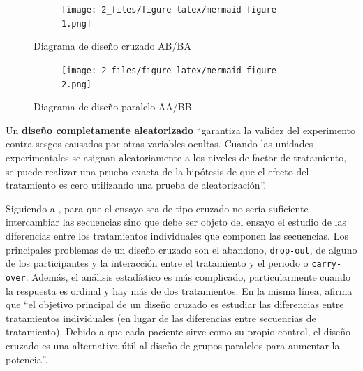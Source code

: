 \documentclass[
  12pt,
  a4paper,
  extrafontsizes,
  onecolumn,
  openright,
  table]{memoir}
\begin{document}
\begin{figure}

{\centering 

\begin{figure}[H]

{\centering \texttt{[image: 2\_files/figure-latex/mermaid-figure-1.png]}

}

\end{figure}

}

\caption{\label{fig-ab-ba}Diagrama de diseño cruzado AB/BA}

\end{figure}

\begin{figure}

{\centering 

\begin{figure}[H]

{\centering \texttt{[image: 2\_files/figure-latex/mermaid-figure-2.png]}

}

\end{figure}

}

\caption{\label{fig-aa-bb}Diagrama de diseño paralelo AA/BB}

\end{figure}

Un \textbf{\gls{diseño completamente aleatorizado}}
\autocite[pp.~18]{lawson2015} \enquote{garantiza la validez del
experimento contra sesgos causados por otras variables ocultas. Cuando
las unidades experimentales se asignan aleatoriamente a los niveles de
factor de tratamiento, se puede realizar una prueba exacta de la
hipótesis de que el efecto del tratamiento es cero utilizando una prueba
de aleatorización}.

Siguiendo a \textcite[pp.~5-9]{senn2022}, para que el ensayo sea de tipo
cruzado no sería suficiente intercambiar las secuencias sino que debe
ser objeto del ensayo el estudio de las diferencias entre los
tratamientos individuales que componen las secuencias. Los principales
problemas de un diseño cruzado son el abandono, \texttt{drop-out}, de
alguno de los participantes y la interacción entre el tratamiento y el
periodo o \texttt{carry-over}. Además, el análisis estadístico es más
complicado, particularmente cuando la respuesta es ordinal y hay más de
dos tratamientos. En la misma línea, \textcite[pp.~1-2]{lui2016} afirma
que \enquote{el objetivo principal de un diseño cruzado es estudiar las
diferencias entre tratamientos individuales (en lugar de las diferencias
entre secuencias de tratamiento). Debido a que cada paciente sirve como
su propio control, el diseño cruzado es una alternativa útil al diseño
de grupos paralelos para aumentar la potencia}.
\end{document}
